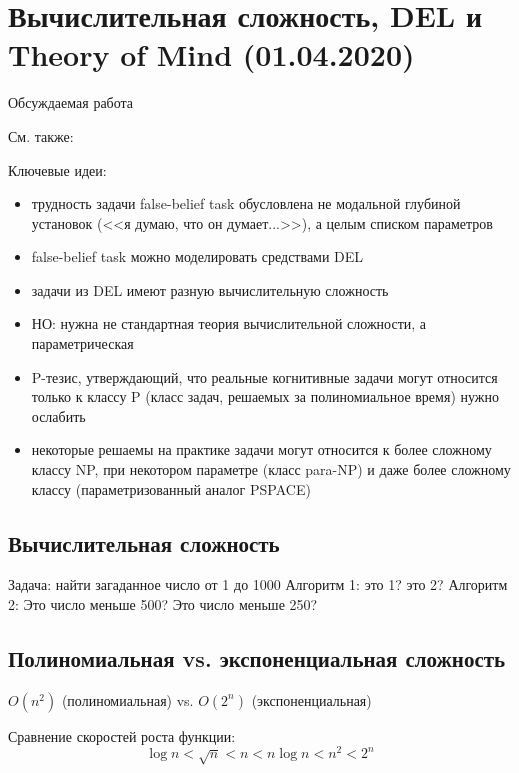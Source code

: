 \section{Вычислительная сложность, DEL и Theory of Mind (01.04.2020)}

\begin{description}
\item[Обсуждаемая работа]\autocite{VandePol2018}
\item[См. также:] \autocite{Abramov2009d,Rubio-Fernandez2013a,Szymanik2018TractabilityMind}
\end{description}


Ключевые идеи:
\begin{itemize}
\item трудность задачи false-belief task обусловлена не модальной глубиной установок (<<я думаю, что он думает...>>), а целым списком параметров 
\item  false-belief task можно моделировать средствами DEL
\item  задачи из DEL имеют разную вычислительную сложность
\item НО: нужна не стандартная теория вычислительной сложности, а параметрическая
\item P-тезис, утверждающий, что реальные когнитивные задачи могут относится только к классу P (класс задач, решаемых за полиномиальное время) нужно ослабить
\item некоторые решаемы на практике задачи могут относится к более сложному классу NP, при некотором параметре (класс para-NP) и даже более сложному классу (параметризованный аналог PSPACE)
\end{itemize}

\subsection{Вычислительная сложность}
Задача: найти загаданное число от 1 до 1000
Алгоритм 1: это 1? это 2?
Алгоритм 2: Это число меньше 500? Это число меньше 250?

\subsection{Полиномиальная vs. экспоненциальная сложность}
$O(n^2)$ (полиномиальная) vs. $O(2^n)$ (экспоненциальная)

Сравнение скоростей роста функции:
\begin{equation}
    \log  n < \sqrt{n} < n < n  \log  n < n^2 < 2^n
\end{equation}


